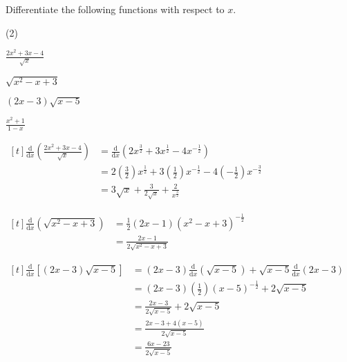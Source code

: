 \documentclass[11pt,a4paper]{book}
\begin{document}
\newpage


\begin{example}

Differentiate the following functions with respect to $x$.

\begin{tasks}[label=(\alph*),label-width=3.5ex](2)

\task $\frac{{\displaystyle 2x^{2}+3x-4}}{{\displaystyle \sqrt{x}}}$

\task $\sqrt{x^{2}-x+3}$

\task $\left(2x-3\right)\sqrt{x-5}$

\task ${\displaystyle \frac{x^{2}+1}{1-x}}$

\end{tasks}

\Solution

\begin{tasks}[label=(\alph*),label-width=3.5ex,after-item-skip = 1cm]


\task
$
\begin{aligned}[t]
{\displaystyle \frac{\mathrm{d}}{\mathrm{d}x}\left(\frac{{\displaystyle 2x^{2}+3x-4}}{{\displaystyle \sqrt{x}}}\right)} & =\frac{\mathrm{d}}{\mathrm{d}x}\left(2x^{\frac{3}{2}}+3x^{\frac{1}{2}}-4x^{-\frac{1}{2}}\right)\\
 & =2\left(\frac{3}{2}\right)x^{\frac{1}{2}}+3\left(\frac{1}{2}\right)x^{-\frac{1}{2}}-4\left(-\frac{1}{2}\right)x^{-\frac{3}{2}}\\
 & =3\sqrt{x}+\frac{3}{2\sqrt{x}}+\frac{2}{x^{\frac{3}{2}}}
\end{aligned}
$

\task
$
\begin{aligned}[t]
{\displaystyle \frac{\mathrm{d}}{\mathrm{d}x}\left(\sqrt{x^{2}-x+3}\right)} & =\frac{1}{2}\left(2x-1\right)\left(x^{2}-x+3\right)^{-\frac{1}{2}}\\
 & =\frac{2x-1}{2\sqrt{x^{2}-x+3}}
\end{aligned}
$

\task
$
\begin{aligned}[t]
\frac{\mathrm{d}}{\mathrm{d}x}\left[\left(2x-3\right)\sqrt{x-5}\right] & =\left(2x-3\right)\frac{\mathrm{d}}{\mathrm{d}x}\left(\sqrt{x-5}\right)+\sqrt{x-5}\frac{\mathrm{d}}{\mathrm{d}x}\left(2x-3\right)\\
 & =\left(2x-3\right)\left(\frac{1}{2}\right)\left(x-5\right)^{-\frac{1}{2}}+2\sqrt{x-5}\\
 & =\frac{2x-3}{2\sqrt{x-5}}+2\sqrt{x-5}\\
 & =\frac{2x-3+4\left(x-5\right)}{2\sqrt{x-5}}\\
 & =\frac{6x-23}{2\sqrt{x-5}}
\end{aligned}
$


\end{tasks}
\end{example}
\end{document}
